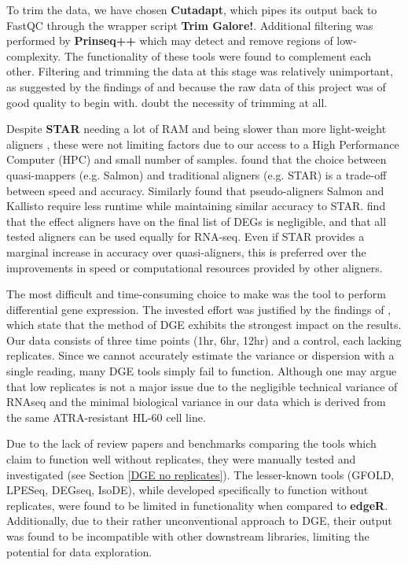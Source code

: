 To trim the data, we have chosen \textbf{Cutadapt}, which pipes its output back to FastQC through the wrapper script \textbf{Trim Galore!}. Additional filtering was performed by \textbf{Prinseq++} which may detect and remove regions of low-complexity. The functionality of these tools were found to complement each other. Filtering and trimming the data at this stage was relatively unimportant, as suggested by the findings of \cite{he2020assessing} and because the raw data of this project was of good quality to begin with. \cite{liao2020read} doubt the necessity of trimming at all.

Despite \textbf{STAR} needing a lot of RAM \citep{Dobin2013} and being slower than more light-weight aligners \citep{srivastava2020alignment}, these were not limiting factors due to our access to a High Performance Computer (HPC) and small number of samples. \cite{srivastava2020alignment} found that the choice between quasi-mappers (e.g. Salmon) and traditional aligners (e.g. STAR) is a trade-off between speed and accuracy. Similarly \cite{Zhang2017} found that pseudo-aligners Salmon and Kallisto require less runtime while maintaining similar accuracy to STAR. \cite{Schaarschmidt2020} find that the effect aligners have on the final list of \ac{DEG}s is negligible, and that all tested aligners can be used equally for RNA-seq. Even if STAR provides a marginal increase in accuracy over quasi-aligners, this is preferred over the improvements in speed or computational resources provided by other aligners.

The most difficult and time-consuming choice to make was the tool to perform differential gene expression. The invested effort was justified by the findings of \cite{williams2017empirical}, which state that the method of \ac{DGE} exhibits the strongest impact on the results. Our data consists of three time points (1hr, 6hr, 12hr) and a control, each lacking replicates. Since we cannot accurately estimate the variance or dispersion with a single reading, many \ac{DGE} tools simply fail to function. Although one may argue that low replicates is not a major issue due to the negligible technical variance of RNAseq \citep{bullard2010evaluation} and the minimal biological variance in our data which is derived from the same \ac{ATRA}-resistant HL-60 cell line.

Due to the lack of review papers and benchmarks comparing the tools which claim to function well without replicates, they were manually tested and investigated (see Section \ref{DGE no replicates}). The lesser-known tools (GFOLD, LPESeq, DEGseq, IsoDE), while developed specifically to function without replicates, were found to be limited in functionality when compared to \textbf{edgeR}. Additionally, due to their rather unconventional approach to \ac{DGE}, their output was found to be incompatible with other downstream libraries, limiting the potential for data exploration.



